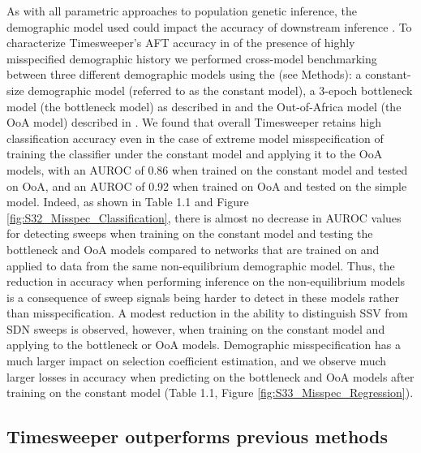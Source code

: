 As with all parametric approaches to population genetic inference, the demographic model used could impact the accuracy of downstream inference \cite{johriProspectAchievingAccurate2022,johriRecommendationsImprovingStatistical2022}. To characterize Timesweeper’s AFT accuracy in of the presence of highly misspecified demographic history we performed cross-model benchmarking between three different demographic models using the (see Methods): a constant-size demographic model (referred to as the constant model), a 3-epoch bottleneck model (the bottleneck model) as described in \cite{marthAlleleFrequencySpectrum2004} and the Out-of-Africa model (the OoA model) described in \cite{gutenkunstInferringJointDemographic2009}.
We found that overall Timesweeper retains high classification accuracy even in the case of extreme model misspecification of training the classifier under the constant model and applying it to the OoA models, with an AUROC of 0.86 when trained on the constant model and tested on OoA, and an AUROC of 0.92 when trained on OoA and tested on the simple model. Indeed, as shown in Table 1.1 and Figure \ref{fig:S32_Misspec_Classification}, there is almost no decrease in AUROC values for detecting sweeps when training on the constant model and testing the bottleneck and OoA models compared to networks that are trained on and applied to data from the same non-equilibrium demographic model. Thus, the reduction in accuracy when performing inference on the non-equilibrium models is a consequence of sweep signals being harder to detect in these models rather than misspecification. A modest reduction in the ability to distinguish SSV from SDN sweeps is observed, however, when training on the constant model and applying to the bottleneck or OoA models. Demographic misspecification has a much larger impact on selection coefficient estimation, and we observe much larger losses in accuracy when predicting on the bottleneck and OoA models after training on the constant model (Table 1.1, Figure \ref{fig:S33_Misspec_Regression}). \\



\newpage
\subsection{Timesweeper outperforms previous methods}

